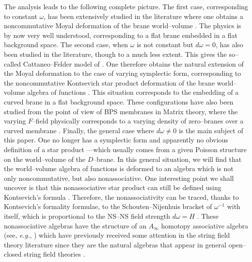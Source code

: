 \documentclass[a4paper,11pt]{article}
\begin{document}
The analysis leads to the following complete picture. The first case,
corresponding to constant $\omega$, has been extensively studied in the
literature where one obtains a noncommutative Moyal deformation of the
brane world--volume \cite{Schomerus, Cornalba-Schiappa, Seiberg-Witten,
Cornalba-2}. The physics is by now very well understood, corresponding to a
flat brane embedded in a flat background space. The second case, when
$\omega$ is not constant but $d\omega=0$, has also been studied in the
literature, though to a much less extent. This gives the so--called
Cattaneo--Felder model of \cite{Cattaneo-Felder}. One therefore obtains the
natural extension of the Moyal deformation to the case of varying
symplectic form, corresponding to the noncommutative Kontsevich star
product deformation of the brane world--volume algebra of functions
\cite{Kontsevich}. This situation corresponds to the embedding of a curved
brane in a flat background space. These configurations have also been
studied from the point of view of BPS membranes in Matrix theory, where the
varying $F$--field physically corresponds to a varying density of
zero--branes over a curved membrane \cite{Cornalba-Taylor, Cornalba-1}.
Finally, the general case where $d\omega \not = 0$ is the main subject of
this paper. One no longer has a symplectic form and apparently no obvious
definition of a star product ---which usually comes from a given Poisson
structure on the world--volume of the $D$--brane.  In this general
situation, we will find that the world--volume algebra of functions is
deformed to an algebra which is not only noncommutative, but also
nonassociative. One interesting point we shall uncover is that this
nonassociative star product can still be defined using Kontsevich's formula
\cite{Kontsevich}. Therefore, the nonassociativity can be traced, thanks to
Kontsevich's formality formulae, to the Schouten--Nijenhuis bracket of
$\omega^{-1}$ with itself, which is proportional to the NS--NS
field strength $d\omega= H$ \cite{Kontsevich, Cattaneo-Felder}. These
nonassociative algebras have the structure of an $A_{\infty}$ homotopy 
associative algebra (see, \textit{e.g.}, \cite{Stasheff, Lada-Stasheff, 
Lada-Markl}) which have previously received some attention in the string 
field theory literature since they are the natural algebras that appear in 
general open--closed string field theories \cite{Zwiebach,GAB}.
\end{document}

